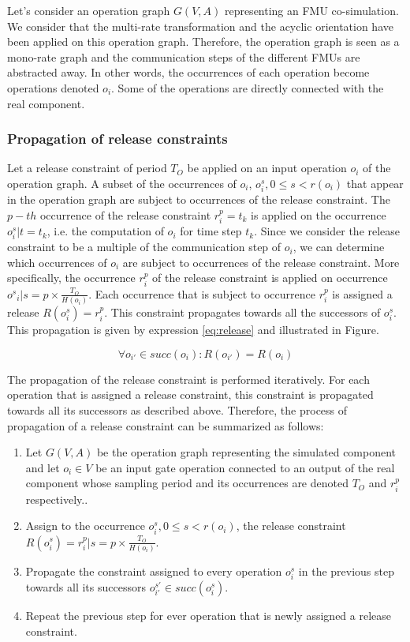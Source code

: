 Let's consider an operation graph $G(V,A)$ representing an FMU co-simulation. We consider that the multi-rate transformation and the acyclic orientation have been applied on this operation graph. Therefore, the operation graph is seen as a mono-rate graph and the communication steps of the different FMUs are abstracted away. In other words, the occurrences of each operation become operations denoted $o_i$. Some of the operations are directly connected with the real component.

\subsubsection{Propagation of release constraints}

Let a release constraint of period $T_O$ be applied on an input operation $o_i$ of the operation graph. A subset of the occurrences of $o_i$, $o^s_i, 0 \leq s < r(o_i)$ that appear in the operation graph are subject to occurrences of the release constraint. The $p-th$ occurrence of the release constraint $r_i^p = t_k$ is applied on the occurrence $o^s_i | t = t_k$, i.e. the computation of $o_i$ for time step $t_k$. Since we consider the release constraint to be a multiple of the communication step of ${o_i}$, we can determine which occurrences of $o_i$ are subject to occurrences of the release constraint. More specifically, the occurrence $r_i^p$ of the release constraint is applied on occurrence ${o^s}_i | s = p \times \frac{T_O}{H(o_i)}$. Each occurrence that is subject to occurrence $r_i^p$ is assigned a release $R(o^s_i) = r_i^p$. This constraint propagates towards all the successors of $o^s_i$. This propagation is given by expression \ref{eq:release} and illustrated in Figure.

\begin{equation}
\forall o_{i'} \in succ(o_i): R(o_{i'}) = R(o_i)
\label{eq:release}
\end{equation}

The propagation of the release constraint is performed iteratively. For each operation that is assigned a release constraint, this constraint is propagated towards all its successors as described above. Therefore, the process of propagation of a release constraint can be summarized as follows:

\begin{enumerate}
\item Let $G(V,A)$ be the operation graph representing the simulated component and let $o_i \in  V$ be an input gate operation connected to an output of the real component whose sampling period and its occurrences are denoted $T_O$ and $r_i^p$ respectively..
\item Assign to the occurrence $o_i^s, 0 \leq s < r(o_i)$, the release constraint $R(o_i^s) = r_i^p | s = p \times \frac{T_O}{H(o_i)}$.
\item Propagate the constraint assigned to every operation $o_i^s$ in the previous step towards all its successors $o_{i'}^{s'} \in succ(o_i^s)$.
\item Repeat the previous step for ever operation that is newly assigned a release constraint.
\end{enumerate}

